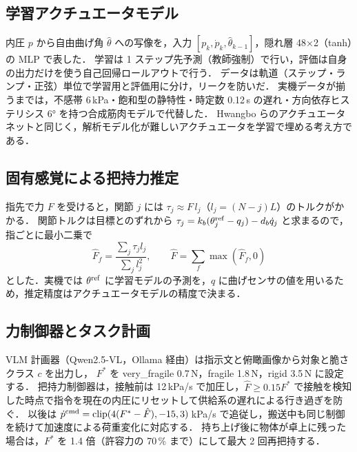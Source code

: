 \documentclass[a4paper,twocolumn,10pt]{ltjsarticle}
\begin{document}
\subsection{学習アクチュエータモデル}
内圧 $p$ から自由曲げ角 $\hat\theta$ への写像を，入力 $[p_k,\dot p_k,\hat\theta_{k-1}]$，隠れ層 48×2（tanh）の MLP で表した．
学習は 1 ステップ先予測（教師強制）で行い，評価は自身の出力だけを使う自己回帰ロールアウトで行う．
データは軌道（ステップ・ランプ・正弦）単位で学習用と評価用に分け，リークを防いだ．
実機データが揃うまでは，不感帯 6\,kPa・飽和型の静特性・時定数 0.12\,s の遅れ・方向依存ヒステリシス 6° を持つ合成筋肉モデルで代替した．
Hwangbo らのアクチュエータネット\cite{hwangbo2019}と同じく，解析モデル化が難しいアクチュエータを学習で埋める考え方である．

\subsection{固有感覚による把持力推定}
指先で力 $F$ を受けると，関節 $j$ には $\tau_j \approx F\,l_j$（$l_j=(N-j)L$）のトルクがかかる．
関節トルクは目標とのずれから $\tau_j = k_b(\theta^{\rm ref}_j-q_j) - d_b\dot q_j$ と求まるので，指ごとに最小二乗で
\begin{equation}
\hat F_f = \frac{\sum_j \tau_j l_j}{\sum_j l_j^2},\qquad \hat F=\sum_f \max(\hat F_f,0)
\end{equation}
とした．実機では $\theta^{\rm ref}$ に学習モデルの予測を，$q$ に曲げセンサの値を用いるため，推定精度はアクチュエータモデルの精度で決まる．

\subsection{力制御器とタスク計画}
VLM 計画器（Qwen2.5-VL\cite{qwen25vl}，Ollama 経由）は指示文と俯瞰画像から対象と脆さクラス $c$ を出力し，
$F^*$ を very\_fragile 0.7\,N，fragile 1.8\,N，rigid 3.5\,N に設定する．
把持力制御器は，接触前は 12\,kPa/s で加圧し，$\hat F \ge 0.15F^*$ で接触を検知した時点で指令を現在の内圧にリセットして供給系の遅れによる行き過ぎを防ぐ．
以後は $\dot p^{\rm cmd} = \mathrm{clip}(4(F^*-\hat F), -15, 3)$\,kPa/s で追従し，搬送中も同じ制御を続けて加速度による荷重変化に対応する．
持ち上げ後に物体が卓上に残った場合は，$F^*$ を 1.4 倍（許容力の 70\,\% まで）にして最大 2 回再把持する．
\end{document}
